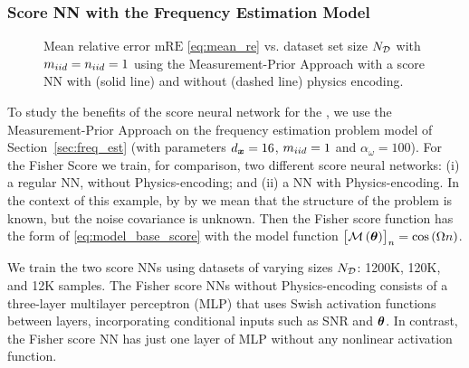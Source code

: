 {\subsubsection{%
\pe{}
Score NN
with 
the Frequency Estimation Model}\label{sec:model_score_analysis}
\begin{figure}
    \centering
    
    \caption{\name{} Mean relative error $\mathrm{mRE}$ \eqref{eq:mean_re} vs.  dataset set size $N_{\mathcal{D}}$ with $m_{iid}=n_{iid}=1$  using the Measurement-Prior Approach with a score NN with (solid line) and without (dashed line) {physics encoding}.    }
    \label{fig:analysis_mi}
\end{figure}
To %
study the benefits of the \pe{} score neural network for the \name{}, {we use the Measurement-Prior Approach} on the frequency estimation problem model of Section~\ref{sec:freq_est} (with parameters ${d_{\bm{x}}}=16$, $m_{iid}=1$ and $\alpha_\omega=100$).
{For the Fisher Score we} train, for comparison,  two different score neural networks: 
(i) {%
a regular NN, without 
Physics-encoding;
and (ii) {%
a NN with  
Physics-encoding.}
{In the context of this example,} by 
\pe{} by we mean that the structure of the problem is known, but the noise covariance is unknown.} Then the Fisher score function has the form of \eqref{eq:model_base_score} with the model function $\left[{\mathcal{M}\left(\bm{\theta}\right)}\right]_n=\cos{\left(\Omega n \right)}$. 


We train the two score NNs
using datasets of varying sizes $N_{\mathcal{D}}$: 1200K, 120K, and 12K samples. 
The Fisher {score} 
NNs
 {without Physics-encoding} consists of a three-layer multilayer perceptron (MLP) that uses Swish\cite{ramachandran2017searching} activation functions between layers, incorporating conditional inputs such as SNR and $\bm{\theta}$. In contrast, the \pe{} Fisher score 
NN {has} 
just one layer of MLP without any nonlinear activation function. 

}
